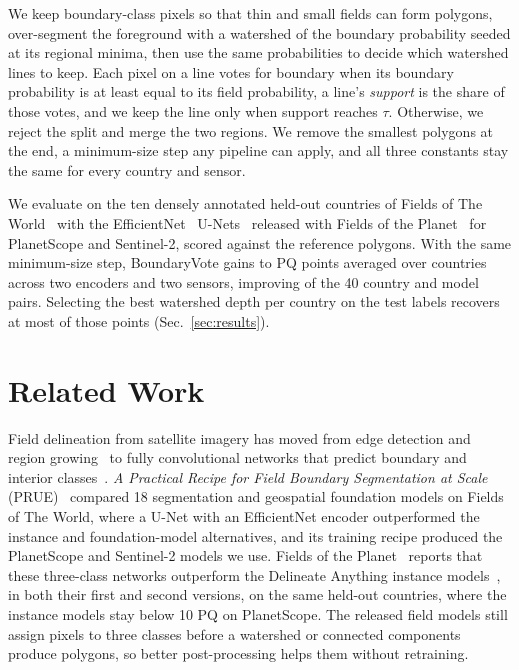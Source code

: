 \documentclass[journal]{IEEEtran}
\begin{document}
We keep boundary-class pixels so that thin and small fields can form polygons, over-segment the foreground with a watershed of the boundary probability seeded at its regional minima, then use the same probabilities to decide which watershed lines to keep.
Each pixel on a line votes for boundary when its boundary probability is at least equal to its field probability, a line's \emph{support} is the share of those votes, and we keep the line only when support reaches $\tau$.
Otherwise, we reject the split and merge the two regions.
We remove the smallest polygons at the end, a minimum-size step any pipeline can apply, and all three constants stay the same for every country and sensor.

We evaluate on the ten densely annotated held-out countries of Fields of The World~\cite{kerner2024ftw} with the EfficientNet~\cite{tan2019efficientnet} U-Nets~\cite{ronneberger2015unet} released with Fields of the Planet~\cite{corley_ftp} for PlanetScope and Sentinel-2, scored against the reference polygons.
With the same minimum-size step, BoundaryVote gains \GainMin{} to \GainMax{} PQ points averaged over countries across two encoders and two sensors, improving \UpTotal{} of the 40 country and model pairs.
Selecting the best watershed depth per country on the test labels recovers at most \OracleGainMax{} of those points (Sec.~\ref{sec:results}).

\section{Related Work}
Field delineation from satellite imagery has moved from edge detection and region growing~\cite{wagner2020growing} to fully convolutional networks that predict boundary and interior classes~\cite{persello2019delineation,waldner2020decode,waldner2020edge}.
\emph{A Practical Recipe for Field Boundary Segmentation at Scale} (PRUE)~\cite{muhawenayo2026prue} compared 18 segmentation and geospatial foundation models on Fields of The World, where a U-Net with an EfficientNet encoder outperformed the instance and foundation-model alternatives, and its training recipe produced the PlanetScope and Sentinel-2 models we use.
Fields of the Planet~\cite{corley_ftp} reports that these three-class networks outperform the Delineate Anything instance models~\cite{lavreniuk2025delineateanything}, in both their first and second versions, on the same held-out countries, where the instance models stay below 10 PQ on PlanetScope.
The released field models still assign pixels to three classes before a watershed or connected components produce polygons, so better post-processing helps them without retraining.
\end{document}
